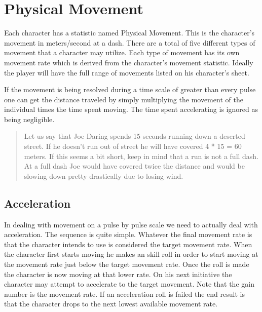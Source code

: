 

\section{Physical Movement}

Each character has a statistic named Physical Movement. This is the character's
movement in meters/second at a dash. There are a total of five different types
of movement that a character may utilize. Each type of movement has its own
movement rate which is derived from the character's movement statistic. 
Ideally the player will have the full range of movements listed on his 
character's sheet. 



If the movement is being resolved during a time scale of greater than every
pulse one can get the distance traveled by simply multiplying the movement 
of the individual times the time spent moving. The time spent accelerating
is ignored as being negligible.

\begin{quote}
Let us say that Joe Daring spends 15 seconds running down a deserted street.
If he doesn't run out of street he will have covered 4 * 15 = 60 meters. If 
this seems a bit short, keep in mind that a run is not a full dash. At a full
dash Joe would have covered twice the distance and would be slowing down pretty 
drastically due to losing wind.
\end{quote}

\subsection{Acceleration}


In dealing with movement on a pulse by pulse scale we need to actually
deal with acceleration. The sequence is quite simple. Whatever the
final movement  rate is that the character intends to use is considered
the target movement rate. When the character first starts moving he
makes an skill roll in order to start moving at the movement
rate just below the target movement rate. Once the roll is made the
character is now moving at that lower rate. On his next  initiative the
character may attempt to accelerate to the target movement. Note  that
the gain number is the movement rate. If an acceleration roll is failed
the end result is that the character drops to the next lowest available
movement  rate. 

